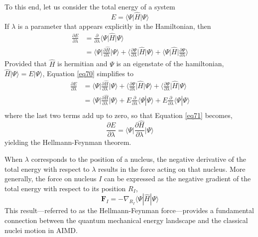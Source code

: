 To this end, let us consider the total energy of a system 
\begin{equation}
	\label{69}
	E = \langle \Psi \big| \hat{H} \big| \Psi \rangle
\end{equation}
If $\lambda$ is a parameter that appears explicitly in the Hamiltonian, then 
\begin{equation}
	\label{eq70}
\begin{aligned}
	\frac{\partial E}{\partial \lambda} &= \frac{\partial}{\partial \lambda} \langle \Psi \big| \hat{H} \big| \Psi \rangle \\
  &= \bigg\langle \Psi \bigg| \frac{\partial \hat{H}}{\partial \lambda} \bigg| \Psi \bigg\rangle + \bigg\langle \frac{\partial \Psi}{\partial \lambda} \bigg| \hat{H} \bigg| \Psi \bigg\rangle +  \bigg\langle \Psi \bigg| \hat{H} \bigg|  \frac{\partial \Psi}{\partial \lambda}  \bigg\rangle
\end{aligned}
\end{equation}
Provided that $\hat{H}$ is hermitian and $\Psi$ is an eigenstate of the hamiltonian, $\hat{H}|\Psi\rangle = E|\Psi\rangle$,
Equation \ref{eq70} simplifies to
\begin{equation}
    \label{eq71}
    \begin{aligned}
        \frac{\partial E}{\partial \lambda} &= 
    \bigg\langle \Psi \bigg| \frac{\partial \hat{H}}{\partial \lambda} \bigg| \Psi \bigg\rangle + 
    \bigg\langle \frac{\partial \Psi}{\partial \lambda}\bigg| \hat{H} \bigg| \Psi \bigg\rangle +  
    \bigg\langle\frac{\partial \Psi}{\partial \lambda}\bigg|\hat{H}\bigg|\Psi \bigg\rangle \\
    &=\bigg\langle \Psi \bigg| \frac{\partial \hat{H}}{\partial \lambda}
        \bigg| \Psi \bigg\rangle + E\frac{\partial}{\partial \lambda}
        \langle \Psi|\Psi \rangle + E\frac{\partial}{\partial \lambda}
        \langle \Psi|\Psi \rangle \\
    \end{aligned}
\end{equation}
where the last two terms add up to zero, so that Equation \ref{eq71} becomes,
\begin{equation}
    \label{eq72}
    \frac{\partial E}{\partial \lambda} = 
    \bigg\langle \Psi \bigg| \frac{\partial \hat{H}}{\partial \lambda} \bigg| \Psi \bigg\rangle 
\end{equation}
yielding the Hellmann-Feynman theorem. 

When $\lambda$ corresponds to the position of a nucleus, the negative 
derivative of the total energy with respect to $\lambda$ results 
in the force acting on that nucleus. More 
generally, the force on nucleus $I$ can be expressed as 
the negative gradient of the total energy with respect to its position $R_I$,
\begin{equation}
    \label{eq73}
    \mathbf{F}_I = -\nabla_{R_I} \langle \Psi | \hat{H} | \Psi \rangle
\end{equation}
This result---referred to as the Hellmann-Feynman force---provides a 
fundamental connection between the quantum mechanical energy landscape and the 
classical nuclei motion in AIMD. 
